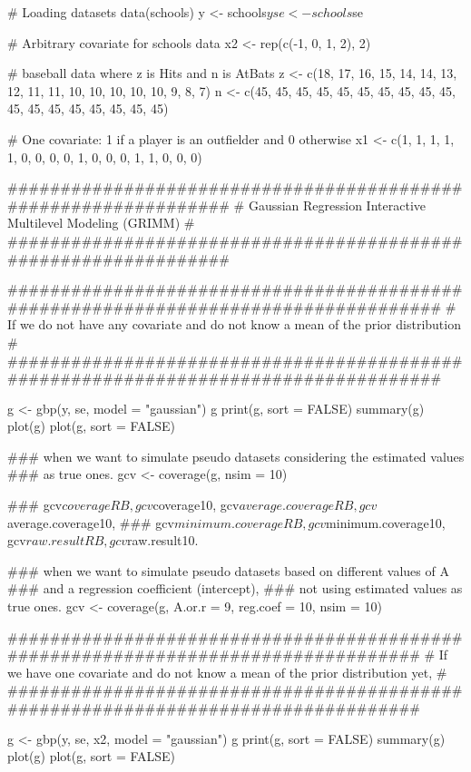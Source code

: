 \documentclass[a4paper]{book}
\begin{document}
\begin{Examples}
\begin{ExampleCode}

  # Loading datasets
  data(schools)
  y <- schools$y
  se <- schools$se

  # Arbitrary covariate for schools data
  x2 <- rep(c(-1, 0, 1, 2), 2)
  
  # baseball data where z is Hits and n is AtBats
  z <- c(18, 17, 16, 15, 14, 14, 13, 12, 11, 11, 10, 10, 10, 10, 10,  9,  8,  7)
  n <- c(45, 45, 45, 45, 45, 45, 45, 45, 45, 45, 45, 45, 45, 45, 45, 45, 45, 45)

  # One covariate: 1 if a player is an outfielder and 0 otherwise
  x1 <- c(1,  1,  1,  1,  1,  0,  0,  0,  0,  1,  0,  0,  0,  1,  1,  0,  0,  0)

  ################################################################
  # Gaussian Regression Interactive Multilevel Modeling (GRIMM) #
  ################################################################

    ####################################################################################
    # If we do not have any covariate and do not know a mean of the prior distribution #
    ####################################################################################

    g <- gbp(y, se, model = "gaussian")
    g
    print(g, sort = FALSE)
    summary(g)
    plot(g)
    plot(g, sort = FALSE)

    ### when we want to simulate pseudo datasets considering the estimated values 
    ### as true ones.
    gcv <- coverage(g, nsim = 10)  

    ### gcv$coverageRB, gcv$coverage10, gcv$average.coverageRB, gcv$average.coverage10,
    ### gcv$minimum.coverageRB, gcv$minimum.coverage10, gcv$raw.resultRB, gcv$raw.result10.

    ### when we want to simulate pseudo datasets based on different values of A
    ### and a regression coefficient (intercept), 
    ### not using estimated values as true ones.
    gcv <- coverage(g, A.or.r = 9, reg.coef = 10, nsim = 10)  

    ##################################################################################
    # If we have one covariate and do not know a mean of the prior distribution yet, #
    ##################################################################################

    g <- gbp(y, se, x2, model = "gaussian")
    g
    print(g, sort = FALSE)
    summary(g)
    plot(g)
    plot(g, sort = FALSE)


\end{ExampleCode}
\end{Examples}
\end{document}
